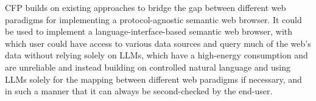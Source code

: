 \documentclass[12pt,a4paper]{article}
\begin{document}
CFP builds on existing approaches to bridge the gap between different web paradigms for implementing a protocol-agnostic semantic web browser. It could be used to implement a language-interface-based semantic web browser, with which user could have access to various data sources and query much of the web's data without relying solely on LLMs, which have a high-energy consumption and are unreliable and instead building on controlled natural language and using LLMs solely for the mapping between different web paradigms if necessary, and in such a manner that it can always be second-checked by the end-user.

\printbibliography
\end{document}
